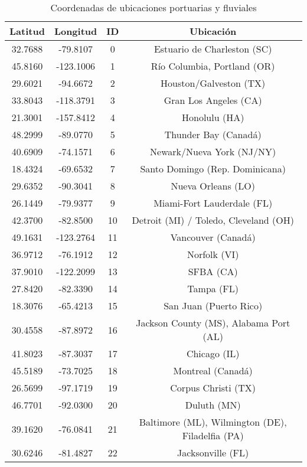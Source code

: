 \documentclass[12pt]{article}
\begin{document}
\begin{table}[H]
	\caption{\label{tabla_hubs} Coordenadas de ubicaciones portuarias y fluviales}
	\centering
	\begin{tabular}{|c|c|c|c|}
		\hline
		Latitud & Longitud & ID & Ubicación \\
		\hline
		32.7688 & -79.8107 & 0  & Estuario de Charleston (SC) \\
		\hline
		45.8160 & -123.1006 & 1  & Río Columbia, Portland (OR) \\
		\hline
		29.6021 & -94.6672 & 2  & Houston/Galveston (TX) \\
		\hline
		33.8043 & -118.3791 & 3  & Gran Los Angeles (CA) \\
		\hline
		21.3001 & -157.8412 & 4  & Honolulu (HA) \\
		\hline
		48.2999 & -89.0770 & 5  & Thunder Bay (Canadá) \\
		\hline
		40.6909 & -74.1571 & 6  & Newark/Nueva York (NJ/NY) \\
		\hline
		18.4324 & -69.6532 & 7  & Santo Domingo (Rep. Dominicana) \\
		\hline
		29.6352 & -90.3041 & 8  & Nueva Orleans (LO) \\
		\hline
		26.1449 & -79.9377 & 9  & Miami-Fort Lauderdale (FL) \\
		\hline
		42.3700 & -82.8500 & 10  & Detroit (MI) / Toledo, Cleveland (OH) \\
		\hline
		49.1631 & -123.2764 & 11  & Vancouver (Canadá) \\
		\hline
		36.9712 & -76.1912 & 12  & Norfolk (VI) \\
		\hline
		37.9010 & -122.2099 & 13  & SFBA (CA) \\
		\hline
		27.8420 & -82.3390 & 14  & Tampa (FL) \\
		\hline
		18.3076 & -65.4213 & 15  & San Juan (Puerto Rico) \\
		\hline
		30.4558 & -87.8972 & 16  & Jackson County (MS), Alabama Port (AL) \\
		\hline
		41.8023 & -87.3037 & 17  & Chicago (IL) \\
		\hline
		45.5189 & -73.7025 & 18  & Montreal (Canadá) \\
		\hline
		26.5699 & -97.1719 & 19  & Corpus Christi (TX) \\
		\hline
		46.7701 & -92.0300 & 20  & Duluth (MN) \\
		\hline
		39.1620 & -76.0841 & 21  & Baltimore (ML), Wilmington (DE), Filadelfia (PA) \\
		\hline
		30.6246 & -81.4827 & 22  & Jacksonville (FL) \\

\end{tabular}
\end{table}
\end{document}
